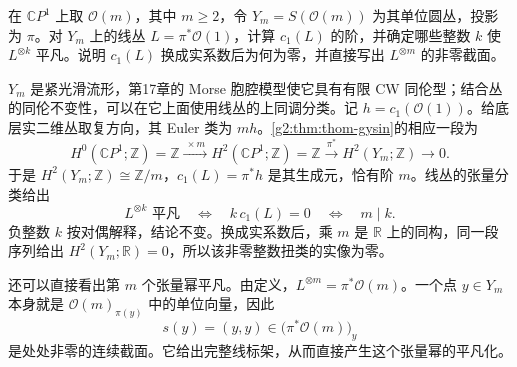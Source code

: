 \begin{exercise}\label{g2:ex:circle-bundle-torsion-line}
	在 \(\mathbb CP^1\) 上取 \(\mathcal O(m)\)，其中 \(m\ge2\)，令 \(Y_m=S(\mathcal O(m))\) 为其单位圆丛，投影为 \(\pi\)。对 \(Y_m\) 上的线丛 \(L=\pi^*\mathcal O(1)\)，计算 \(c_1(L)\) 的阶，并确定哪些整数 \(k\) 使 \(L^{\otimes k}\) 平凡。说明 \(c_1(L)\) 换成实系数后为何为零，并直接写出 \(L^{\otimes m}\) 的非零截面。
\end{exercise}
\begin{solution}
	\(Y_m\) 是紧光滑流形，第17章的 Morse 胞腔模型使它具有有限 CW 同伦型；结合丛的同伦不变性，可以在它上面使用线丛的上同调分类。记 \(h=c_1(\mathcal O(1))\)。给底层实二维丛取复方向，其 Euler 类为 \(mh\)。\cref{g2:thm:thom-gysin}的相应一段为
	\[
		H^0(\mathbb CP^1;\mathbb Z)=\mathbb Z
		\xrightarrow{\ \times m\ }H^2(\mathbb CP^1;\mathbb Z)=\mathbb Z
		\xrightarrow{\pi^*}H^2(Y_m;\mathbb Z)\longrightarrow0.
	\]
	于是 \(H^2(Y_m;\mathbb Z)\cong\mathbb Z/m\)，\(c_1(L)=\pi^*h\) 是其生成元，恰有阶 \(m\)。线丛的张量分类给出
	\[
		L^{\otimes k}\text{ 平凡}\quad\Longleftrightarrow\quad k\,c_1(L)=0
		\quad\Longleftrightarrow\quad m\mid k.
	\]
	负整数 \(k\) 按对偶解释，结论不变。换成实系数后，乘 \(m\) 是 \(\mathbb R\) 上的同构，同一段序列给出 \(H^2(Y_m;\mathbb R)=0\)，所以该非零整数扭类的实像为零。

	还可以直接看出第 \(m\) 个张量幂平凡。由定义，\(L^{\otimes m}=\pi^*\mathcal O(m)\)。一个点 \(y\in Y_m\) 本身就是 \(\mathcal O(m)_{\pi(y)}\) 中的单位向量，因此
	\[
		s(y)=(y,y)\in\bigl(\pi^*\mathcal O(m)\bigr)_y
	\]
	是处处非零的连续截面。它给出完整线标架，从而直接产生这个张量幂的平凡化。
\end{solution}

